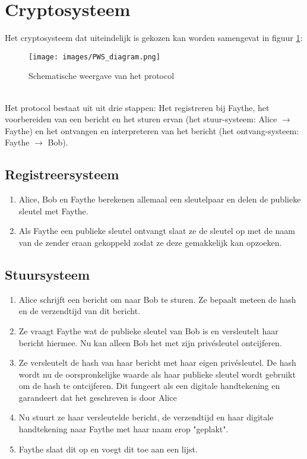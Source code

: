 \documentclass{report} %
\begin{document}
\section{Cryptosysteem}
Het cryptosysteem dat uiteindelijk is gekozen kan worden samengevat in figuur \ref{fig:protocol}:
\begin{figure}[h!]
    \centering
    \texttt{[image: images/PWS\_diagram.png]}
    \caption{Schematische weergave van het protocol}
    \label{fig:protocol}
\end{figure}\\
Het protocol bestaat uit uit drie stappen: Het registreren bij Faythe, het voorbereiden van een bericht en het sturen ervan (het stuur-systeem: Alice $\rightarrow$ Faythe) en het ontvangen en interpreteren van het bericht (het ontvang-systeem: Faythe $\rightarrow$ Bob).

\subsection{Registreersysteem}
\begin{enumerate}
    \item Alice, Bob en Faythe berekenen allemaal een sleutelpaar en delen de publieke sleutel met Faythe.
    \item Als Faythe een publieke sleutel ontvangt slaat ze de sleutel op met de naam van de zender eraan gekoppeld zodat ze deze gemakkelijk kan opzoeken.
\end{enumerate}

\subsection{Stuursysteem}
\begin{enumerate}
    \item Alice schrijft een bericht om naar Bob te sturen. Ze bepaalt meteen de hash en de verzendtijd van dit bericht.
    \item Ze vraagt Faythe wat de publieke sleutel van Bob is en versleutelt haar bericht hiermee. Nu kan alleen Bob het met zijn privésleutel ontcijferen.
    \item Ze versleutelt de hash van haar bericht met haar eigen privésleutel. De hash wordt nu de oorspronkelijke waarde als haar publieke sleutel wordt gebruikt om de hash te ontcijferen. Dit fungeert als een digitale handtekening en garandeert dat het geschreven is door Alice
    \item Nu stuurt ze haar versleutelde bericht, de verzendtijd en haar digitale handtekening naar Faythe met haar naam erop "geplakt".
    \item Faythe slaat dit op en voegt dit toe aan een lijst.
\end{enumerate}
\end{document}

